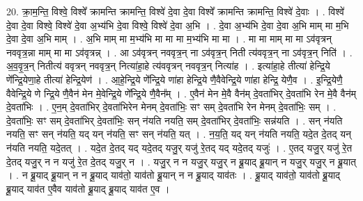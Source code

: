 \documentclass[17pt]{extarticle}
\begin{document}
20. क्रा॒म॒न्ति॒ विश्वे॒ विश्वे᳚ क्रामन्ति क्रामन्ति॒ विश्वे॑ दे॒वा दे॒वा विश्वे᳚ क्रामन्ति क्रामन्ति॒ विश्वे॑ दे॒वाः । . विश्वे॑ दे॒वा दे॒वा विश्वे॒ विश्वे॑ दे॒वा अ॒भ्य॑भि दे॒वा विश्वे॒ विश्वे॑ दे॒वा अ॒भि । . दे॒वा अ॒भ्य॑भि दे॒वा दे॒वा अ॒भि माम् मा म॒भि दे॒वा दे॒वा अ॒भि माम् । . अ॒भि माम् मा म॒भ्य॑भि मा मा मा म॒भ्य॑भि मा मा । . मा मा माम् मा मा ऽव॑वृत्रन् नववृत्र॒न्ना माम् मा मा ऽव॑वृत्रन्न् । . आ ऽव॑वृत्रन् नववृत्र॒न् ना ऽव॑वृत्र॒न् निती त्य॑ववृत्र॒न् ना ऽव॑वृत्र॒न् निति॑ । . अ॒व॒वृ॒त्र॒न् नितीत्य॑ ववृत्रन् नववृत्र॒न् नित्या॑हा॒हे त्य॑ववृत्रन् नववृत्र॒न् नित्या॑ह । . इत्या॑हा॒हे तीत्या॑ हेन्द्रि॒ये णे᳚न्द्रि॒येणा॒हे तीत्या॑ हेन्द्रि॒येण॑ । . आ॒हे॒न्द्रि॒ये णे᳚न्द्रि॒ये णा॑हा हेन्द्रि॒ये णै॒वैवेन्द्रि॒ये णा॑हा हेन्द्रि॒ येणै॒व । . इ॒न्द्रि॒येणै॒ वैवेन्द्रि॒ये णे न्द्रि॒ये णै॒वैन॑ मेन मे॒वेन्द्रि॒ये णे᳚न्द्रि॒ये णै॒वैन᳚म् । . ए॒वैन॑ मेन मे॒वै वैन॑म् दे॒वता॑भिर् दे॒वता॑भि रेन मे॒वै वैन॑म् दे॒वता॑भिः । . ए॒न॒म् दे॒वता॑भिर् दे॒वता॑भिरेन मेनम् दे॒वता॑भिः॒ सꣳ सम् दे॒वता॑भि रेन मेनम् दे॒वता॑भिः॒ सम् । . दे॒वता॑भिः॒ सꣳ सम् दे॒वता॑भिर् दे॒वता॑भिः॒ सन् न॑यति नयति॒ सम् दे॒वता॑भिर् दे॒वता॑भिः॒ सन्न॑यति । . सन् न॑यति नयति॒ सꣳ सन् न॑यति॒ यद् यन् न॑यति॒ सꣳ सन् न॑यति॒ यत् । . न॒य॒ति॒ यद् यन् न॑यति नयति॒ यदे॒त दे॒तद् यन् न॑यति नयति॒ यदे॒तत् । . यदे॒त दे॒तद् यद् यदे॒तद् यजु॒र् यजु॑ रे॒तद् यद् यदे॒तद् यजुः॑ । . ए॒तद् यजु॒र् यजु॑ रे॒त दे॒तद् यजु॒र् न न यजु॑ रे॒त दे॒तद् यजु॒र् न । . यजु॒र् न न यजु॒र् यजु॒र् न ब्रू॒याद् ब्रू॒यान् न यजु॒र् यजु॒र् न ब्रू॒यात् । . न ब्रू॒याद् ब्रू॒यान् न न ब्रू॒याद् याव॑तो॒ याव॑तो ब्रू॒यान् न न ब्रू॒याद् याव॑तः । . ब्रू॒याद् याव॑तो॒ याव॑तो ब्रू॒याद् ब्रू॒याद् याव॑त ए॒वैव याव॑तो ब्रू॒याद् ब्रू॒याद् याव॑त ए॒व । \newline
\end{document}
